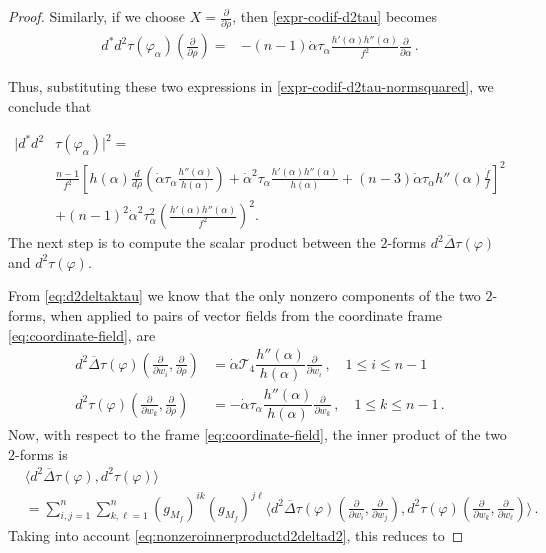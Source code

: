 \documentclass[11pt]{amsart}
\theoremstyle{plain}
\theoremstyle{definition}
\numberwithin{equation}{section}
\numberwithin{equation}{section}
\begin{document}
\begin{proof}
Similarly, if we choose $X = \frac{\partial}{\partial \rho}$, then \eqref{expr-codif-d2tau} becomes
\begin{align*}
d^*d^2 \tau(\varphi_\alpha)\left(\frac{\partial}{\partial \rho}\right) 	
= & -(n-1) \dot{\alpha} \tau_{\alpha} \frac{h'(\alpha)h''(\alpha)}{f^2} \frac{\partial}{\partial \alpha}\,.
\end{align*}	

Thus, substituting these two expressions in \eqref{expr-codif-d2tau-normsquared}, we conclude that

{\small
\begin{align}\label{expr-codif-d2tau-normsquared-final}
|d^*d^2 &\tau(\varphi_\alpha)|^2 =\nonumber\\
 & \frac{n-1}{f^2} \left[ h(\alpha) \frac{d}{d \rho}\left(\dot{\alpha} \tau_{\alpha} \frac{h''(\alpha)}{h(\alpha)}\right) +  \dot{\alpha}^2 \tau_{\alpha} \frac{h'(\alpha)h''(\alpha)}{h(\alpha)} + (n-3) \dot{\alpha} \tau_{\alpha} h''(\alpha)\frac{\dot{f}}{f} \right]^2 \nonumber\\
& + (n-1)^2 \dot{\alpha}^2 \tau_{\alpha}^2 \left(\frac{h'(\alpha)h''(\alpha)}{f^2}\right)^2.
\end{align}
}
The next step is to compute the scalar product between the $2$-forms $d^2\overline{\Delta}\tau(\varphi)$ and $d^2 \tau(\varphi)$. 

From \eqref{eq:d2deltaktau} we know that the only nonzero components of the two $2$-forms, when applied to pairs of vector fields from the coordinate frame  \eqref{eq:coordinate-field}, are
\begin{equation}\label{eq:nonzeroinnerproductd2deltad2}
\begin{split}
d^2\overline{\Delta}\tau(\varphi)\left(\frac{\partial}{\partial w_i},\frac{\partial}{\partial \rho}\right)&= \dot{\alpha} \mathcal{T}_{4} \dfrac{h''(\alpha)}{h(\alpha)} \frac{\partial}{\partial w_i}\,,\quad 1\leq i\leq n-1\\
d^2\tau(\varphi)\left(\frac{\partial}{\partial w_k},\frac{\partial}{\partial \rho}\right)&= -\dot{\alpha} \tau_{\alpha} \dfrac{h''(\alpha)}{h(\alpha)} \frac{\partial}{\partial w_k}\,,\quad 1\leq k\leq n-1\,.
\end{split}
\end{equation}
Now, with respect to the frame \eqref{eq:coordinate-field}, the inner product of the two $2$-forms is
\[
\begin{split}
&\langle d^2\overline{\Delta}\tau(\varphi), d^2 \tau(\varphi) \rangle\\
&=\sum_{i,j=1}^{n}\sum_{k,\ell=1}^{n} (g_{M_f})^{ik}(g_{M_f})^{j\ell}
\langle d^2\overline{\Delta}\tau(\varphi)\left(\frac{\partial}{\partial w_i},\frac{\partial}{\partial w_j}\right), d^2\tau(\varphi)\left(\frac{\partial}{\partial w_k},\frac{\partial}{\partial w_\ell}\right)\rangle \,.
\end{split}
\]
Taking into account \eqref{eq:nonzeroinnerproductd2deltad2}, this reduces to


\end{proof}
\end{document}
